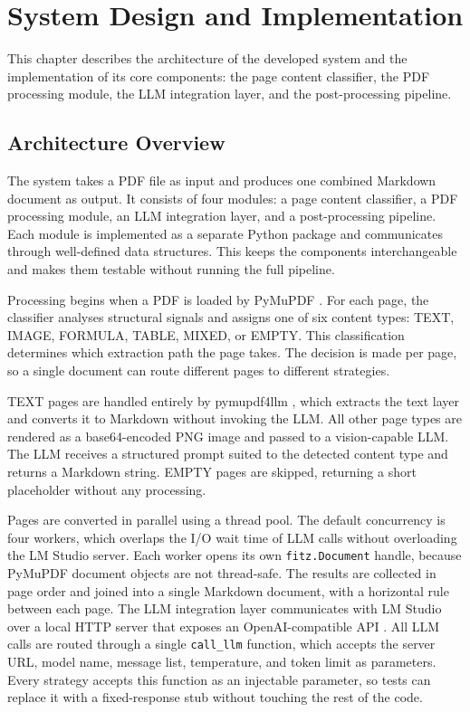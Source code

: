 \documentclass[12pt]{article}
\begin{document}
\section{System Design and Implementation}

This chapter describes the architecture of the developed system and the implementation of its core components: the page content classifier, the PDF processing module, the LLM integration layer, and the post-processing pipeline.

\subsection{Architecture Overview}

The system takes a PDF file as input and produces one combined Markdown document as output.
It consists of four modules: a page content classifier, a PDF processing module, an LLM integration layer, and a post-processing pipeline.
Each module is implemented as a separate Python package and communicates through well-defined data structures.
This keeps the components interchangeable and makes them testable without running the full pipeline.

Processing begins when a PDF is loaded by PyMuPDF \cite{pymupdf}.
For each page, the classifier analyses structural signals and assigns one of six content types: TEXT, IMAGE, FORMULA, TABLE, MIXED, or EMPTY.
This classification determines which extraction path the page takes.
The decision is made per page, so a single document can route different pages to different strategies.

TEXT pages are handled entirely by pymupdf4llm \cite{pymupdf4llm}, which extracts the text layer and converts it to Markdown without invoking the LLM.
All other page types are rendered as a base64-encoded PNG image and passed to a vision-capable LLM.
The LLM receives a structured prompt suited to the detected content type and returns a Markdown string.
EMPTY pages are skipped, returning a short placeholder without any processing.

Pages are converted in parallel using a thread pool. The default concurrency is four workers, which overlaps the I/O wait time of LLM calls without overloading the LM Studio server. Each worker opens its own \texttt{fitz.Document} handle, because PyMuPDF document objects are not thread-safe. The results are collected in page order and joined into a single Markdown document, with a horizontal rule between each page. The LLM integration layer communicates with LM Studio \cite{lmstudio} over a local HTTP server that exposes an OpenAI-compatible API \cite{khan2024}. All LLM calls are routed through a single \texttt{call\_llm} function, which accepts the server URL, model name, message list, temperature, and token limit as parameters. Every strategy accepts this function as an injectable parameter, so tests can replace it with a fixed-response stub without touching the rest of the code.
\end{document}
